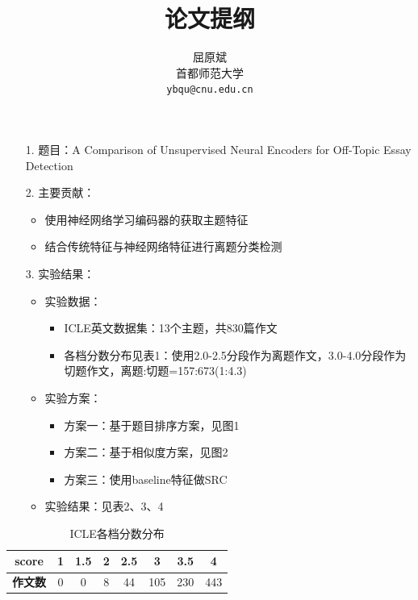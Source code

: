 \documentclass[11pt]{article}
\title{论文提纲}
\author{屈原斌 \\
  首都师范大学 \\
    {\tt ybqu@cnu.edu.cn}}
\date{}
\begin{document}
\begin{CJK}{UTF8}{gkai}

\maketitle
\CJKindent




\begin{itemize}
  \item [1.] 题目：A Comparison of Unsupervised Neural Encoders for Off-Topic Essay Detection
  \item [2.] 主要贡献：
  \begin{itemize}
    \item 使用神经网络学习编码器的获取主题特征
    \item 结合传统特征与神经网络特征进行离题分类检测
  \end{itemize}
  \item [3.] 实验结果：
  \begin{itemize}
    \item 实验数据：
    \begin{itemize}
      \item ICLE英文数据集：13个主题，共830篇作文
      \item 各档分数分布见表1：使用2.0-2.5分段作为离题作文，3.0-4.0分段作为切题作文，离题:切题=157:673(1:4.3)
    \end{itemize}
    \item 实验方案：
    \begin{itemize}
      \item 方案一：基于题目排序方案，见图1
      \item 方案二：基于相似度方案，见图2
      \item 方案三：使用baseline特征做SRC
    \end{itemize}
    \item 实验结果：见表2、3、4
  \end{itemize}
\end{itemize}

\begin{table}[htbp]
  \centering
  \begin{tabular}{cccccccc}
    \hline
    \textbf{score} & \textbf{1} & \textbf{1.5} & \textbf{2} & \textbf{2.5} & \textbf{3} & \textbf{3.5} & \textbf{4} \\
    \hline
    \textbf{作文数} & 0     & 0     & 8     & 44    & 105   & 230   & 443 \\
    \hline
  \end{tabular}%
  \caption{ICLE各档分数分布}
  \label{tab:addlabel}%
\end{table}%



\end{CJK}
\end{document}
